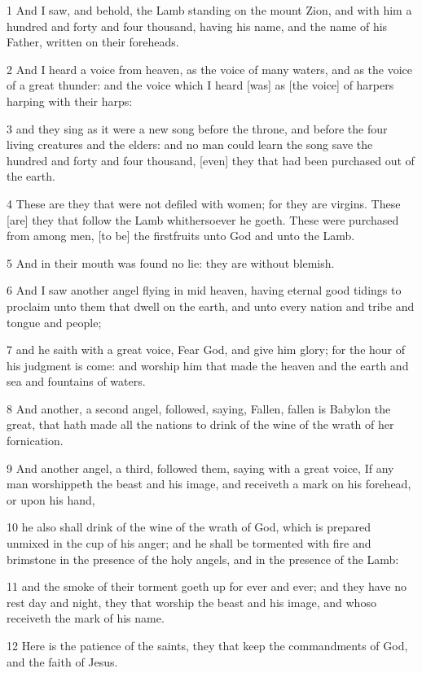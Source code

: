 \par 1 And I saw, and behold, the Lamb standing on the mount Zion, and with him a hundred and forty and four thousand, having his name, and the name of his Father, written on their foreheads.
\par 2 And I heard a voice from heaven, as the voice of many waters, and as the voice of a great thunder: and the voice which I heard [was] as [the voice] of harpers harping with their harps:
\par 3 and they sing as it were a new song before the throne, and before the four living creatures and the elders: and no man could learn the song save the hundred and forty and four thousand, [even] they that had been purchased out of the earth.
\par 4 These are they that were not defiled with women; for they are virgins. These [are] they that follow the Lamb whithersoever he goeth. These were purchased from among men, [to be] the firstfruits unto God and unto the Lamb.
\par 5 And in their mouth was found no lie: they are without blemish.
\par 6 And I saw another angel flying in mid heaven, having eternal good tidings to proclaim unto them that dwell on the earth, and unto every nation and tribe and tongue and people;
\par 7 and he saith with a great voice, Fear God, and give him glory; for the hour of his judgment is come: and worship him that made the heaven and the earth and sea and fountains of waters.
\par 8 And another, a second angel, followed, saying, Fallen, fallen is Babylon the great, that hath made all the nations to drink of the wine of the wrath of her fornication.
\par 9 And another angel, a third, followed them, saying with a great voice, If any man worshippeth the beast and his image, and receiveth a mark on his forehead, or upon his hand,
\par 10 he also shall drink of the wine of the wrath of God, which is prepared unmixed in the cup of his anger; and he shall be tormented with fire and brimstone in the presence of the holy angels, and in the presence of the Lamb:
\par 11 and the smoke of their torment goeth up for ever and ever; and they have no rest day and night, they that worship the beast and his image, and whoso receiveth the mark of his name.
\par 12 Here is the patience of the saints, they that keep the commandments of God, and the faith of Jesus.
